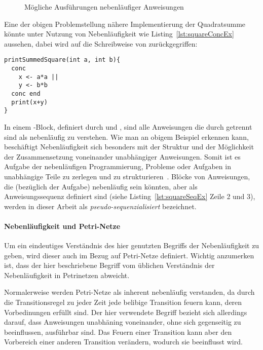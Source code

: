 \begin{figure}[hbt]
\begin{subfigure}{\textwidth}
\begin{tikzpicture}
\end{tikzpicture}
\end{subfigure}

\caption{Mögliche Ausführungen nebenläufiger Anweisungen}\label{fig:concAnweisungen}
\end{figure}

Eine der obigen Problemstellung nähere Implementierung der Quadratsumme könnte unter Nutzung von Nebenläufigkeit wie Listing~\ref{lst:squareConcEx} aussehen, dabei wird auf die Schreibweise von \textcite[S.~16]{Herrtwich1989} zurückgegriffen:
\begin{lstlisting}[caption={Beispiel eines Programms mit nebenläufigem Code in einem \code{conc}-Block. Das Programm gibt die Summe von zwei Quadratzahlen aus, wobei die Berechnung der Quadratzahlen nebenläufig stattfindet.}, label={lst:squareConcEx}]
printSummedSquare(int a, int b){
  conc 
    x <- a*a ||
    y <- b*b
  conc end
  print(x+y)
}
\end{lstlisting}
In einem -Block, definiert durch  und , sind alle Anweisungen die durch \code{||} getrennt sind als nebenläufig zu verstehen. Wie man an obigem Beispiel erkennen kann, beschäftigt Nebenläufigkeit sich besonders mit der Struktur und der Möglichkeit der Zusammensetzung voneinander unabhängiger Anweisungen. Somit ist es Aufgabe der nebenläufigen Programmierung, Probleme oder Aufgaben in unabhängige Teile zu zerlegen und zu strukturieren~\cite{Pike2012,Hettel2016}. Blöcke von Anweisungen, die (bezüglich der Aufgabe) nebenläufig sein könnten, aber als Anweisungssequenz definiert sind (siehe Listing~\ref{lst:squareSeqEx} Zeile 2 und 3), werden in dieser Arbeit als \emph{pseudo-sequenzialisiert} bezeichnet.

\paragraph{Nebenläufigkeit und Petri-Netze}
Um ein eindeutiges Verständnis des hier genutzten Begriffs der Nebenläufigkeit zu geben, wird dieser auch im Bezug auf Petri-Netze definiert. Wichtig anzumerken ist, dass der hier beschriebene Begriff vom üblichen Verständnis der Nebenläufigkeit in Petrinetzen abweicht. 

Normalerweise werden Petri-Netze  als inherent nebenläufig verstanden, da durch die Transitionsregel zu jeder Zeit jede belibige Transition feuern kann, deren Vorbedinungen erfüllt sind. Der hier verwendete Begriff bezieht sich allerdings darauf, dass Anweisungen unabhäning voneinander, ohne sich gegenseitig zu beeinflussen, ausführbar sind. Das Feuern einer Transition kann aber den Vorbereich einer anderen Transition verändern, wodurch sie beeinflusst wird.

